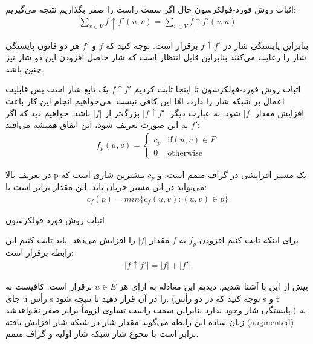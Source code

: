 \begin{itemframe}{اثبات روش فورد-فولکرسون}
\itm
حال اگر سمت راست  را صفر بگذاریم نتیجه می‌گیریم:
\begin{align*}
\sum_{v\in V} f \uparrow f'(u, v)  = \sum_{v\in V} f \uparrow f'(v, u)
\end{align*}

\itm
بنابراین پایستگی شار در
$ f \uparrow f'$
برقرار است. توجه کنید که
$f$
و
$f'$
هر دو قانون پایستگی شار را رعایت می‌کنند بنابراین قابل انتظار است که شار حاصل افزودن این دو شار نیز چنین باشد.
\end{itemframe}

\begin{itemframe}{اثبات روش فورد-فولکرسون}
\itm
تا اینجا ثابت کردیم
$ f \uparrow f'$
یک تابع شار است پس قابلیت اعمال بر شبکه شار را دارد، امّا این کافی نیست. می‌خواهیم انجام این کار باعث افزایش مقدار
$|f|$
شود. به عبارت دیگر
$|f \uparrow f'|$
بزرگ‌تر از
$|f|$
باشد.
\itm
خواهیم دید که اگر
$f'$
به این صورت تعریف شود، این اتفاق همیشه می‌افتد:
\begin{align}
f_p(u, v)=
\begin{cases}
c_p& \text{if} (u, v) \in P\\
0 &\text{otherwise}
\end{cases}
\label{aug-path}
\end{align}


\itm
در تعریف بالا p یک مسیر افزایشی در گراف متمم است. و
$c_p$
بیشترین شاری است که می‌تواند در این مسیر جریان یابد. این مقدار برابر است با:
\begin{align}
c_f(p) = min \{c_f(u, v): (u, v) \in p\}
\label{path-cap}
\end{align}

\end{itemframe}


\begin{itemframe}{اثبات روش فورد-فولکرسون}

\itm
برای اینکه ثابت کنیم افزودن
$f_p$
به
$f$
مقدار
$|f|$
را افزایش می‌دهد. باید ثابت کنیم این رابطه برقرار است:
\begin{align}
|f \uparrow f'|=|f| + |f'|
\label{aug-flow-sum}
\end{align}
\itm

پیش از این با
آشنا شدیم. دیدیم این معادله به ازای هر
$u \in E$
برقرار است. کافیست به جای u رأس s را در آن قرار دهید تا
نتیجه شود. (توجه کنید که در دو رأس s و t پایستگی شار وجود ندارد بنابراین سمت راست تساوی لزوماُ برابر صفر نخواهد‌شد.)
\itm
به زبان ساده این رابطه می‌گوید مقدار شار در شبکه شار افزایش یافته (augmented) برابر است با مجوع شار شبکه شار اولیه و گراف متمم.
\end{itemframe}


